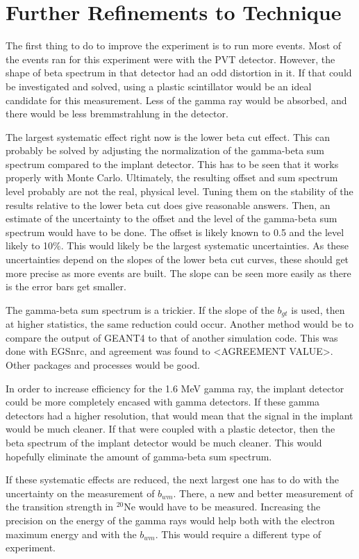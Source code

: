 \documentclass[main.tex]{subfiles}
\begin{document}
\section{Further Refinements to Technique}
The first thing to do to improve the experiment is to run more events.
Most of the events ran for this experiment were with the PVT detector.
However, the shape of beta spectrum in that detector had an odd distortion in it.
If that could be investigated and solved, using a plastic scintillator would be an ideal candidate for this measurement.
Less of the gamma ray would be absorbed, and there would be less bremmstrahlung in the detector.

The largest systematic effect right now is the lower beta cut effect. 
This can probably be solved by adjusting the normalization of the gamma-beta sum spectrum compared to the implant detector. 
This has to be seen that it works properly with Monte Carlo.
Ultimately, the resulting offset and sum spectrum level probably are not the real, physical level.
Tuning them on the stability of the results relative to the lower beta cut does give reasonable answers.
Then, an estimate of the uncertainty to the offset and the level of the gamma-beta sum spectrum would have to be done.
The offset is likely known to 0.5 and the level likely to 10\%.
This would likely be the largest systematic uncertainties.
As these uncertainties depend on the slopes of the lower beta cut curves, these should get more precise as more events are built.
The slope can be seen more easily as there is the error bars get smaller.

The gamma-beta sum spectrum is a trickier. 
If the slope of the $b_{gt}$ is used, then at higher statistics, the same reduction could occur. 
Another method would be to compare the output of GEANT4 to that of another simulation code.
This was done with EGSnrc, and agreement was found to <AGREEMENT VALUE>.
Other packages and processes would be good.

In order to increase efficiency for the 1.6 MeV gamma ray, the implant detector could be more completely encased with gamma detectors.
If these gamma detectors had a higher resolution, that would mean that the signal in the implant would be much cleaner.
If that were coupled with a plastic detector, then the beta spectrum of the implant detector would be much cleaner.
This would hopefully eliminate the amount of gamma-beta sum spectrum.

If these systematic effects are reduced, the next largest one has to do with the uncertainty on the measurement of $b_{wm}$.
There, a new and better measurement of the transition strength in $^{20}$Ne would have to be measured.
Increasing the precision on the energy of the gamma rays would help both with the electron maximum energy and with the $b_{wm}$.
This would require a different type of experiment.
\end{document}
